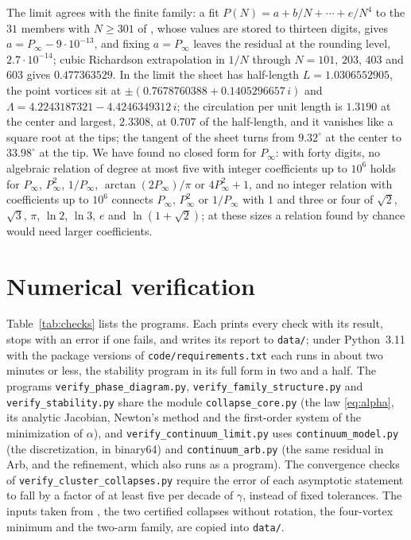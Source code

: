 \documentclass[11pt]{article}
\theoremstyle{definition}
\begin{document}
The limit agrees with the finite family: a fit $P(N) = a + b/N + \cdots + e/N^4$ to the $31$ members with $N \ge 301$ of \cite[Sect.~7]{mw2026}, whose values are stored to thirteen digits, gives $a = P_\infty - 9 \cdot 10^{-13}$, and fixing $a = P_\infty$ leaves the residual at the rounding level, $2.7 \cdot 10^{-14}$; cubic Richardson extrapolation in $1/N$ through $N = 101$, $203$, $403$ and $603$ gives $0.477363529$. In the limit the sheet has half-length $L = 1.0306552905$, the point vortices sit at $\pm(0.7678760388 + 0.1405296657\,i)$ and $\Lambda = 4.2243187321 - 4.4246349312\,i$; the circulation per unit length is $1.3190$ at the center and largest, $2.3308$, at $0.707$ of the half-length, and it vanishes like a square root at the tips; the tangent of the sheet turns from $9.32^\circ$ at the center to $33.98^\circ$ at the tip. We have found no closed form for $P_\infty$: with forty digits, no algebraic relation of degree at most five with integer coefficients up to $10^6$ holds for $P_\infty$, $P_\infty^2$, $1/P_\infty$, $\arctan(2P_\infty)/\pi$ or $4P_\infty^2 + 1$, and no integer relation with coefficients up to $10^6$ connects $P_\infty$, $P_\infty^2$ or $1/P_\infty$ with $1$ and three or four of $\sqrt{2}$, $\sqrt{3}$, $\pi$, $\ln 2$, $\ln 3$, $e$ and $\ln(1 + \sqrt{2})$; at these sizes a relation found by chance would need larger coefficients.

\section{Numerical verification}\label{sec:numerics}

Table~\ref{tab:checks} lists the programs. Each prints every check with its result, stops with an error if one fails, and writes its report to \texttt{data/}; under Python~3.11 with the package versions of \texttt{code/requirements.txt} each runs in about two minutes or less, the stability program in its full form in two and a half. The programs \texttt{verify\_\allowbreak phase\_\allowbreak diagram.py}, \texttt{verify\_\allowbreak family\_\allowbreak structure.py} and \texttt{verify\_\allowbreak stability.py} share the module \texttt{collapse\_\allowbreak core.py} (the law \eqref{eq:alpha}, its analytic Jacobian, Newton's method and the first-order system of the minimization of $\alpha$), and \texttt{verify\_\allowbreak continuum\_\allowbreak limit.py} uses \texttt{continuum\_\allowbreak model.py} (the discretization, in binary64) and \texttt{continuum\_\allowbreak arb.py} (the same residual in Arb, and the refinement, which also runs as a program). The convergence checks of \texttt{verify\_\allowbreak cluster\_\allowbreak collapses.py} require the error of each asymptotic statement to fall by a factor of at least five per decade of $\gamma$, instead of fixed tolerances. The inputs taken from \cite{mw2026}, the two certified collapses without rotation, the four-vortex minimum and the two-arm family, are copied into \texttt{data/}.
\end{document}
